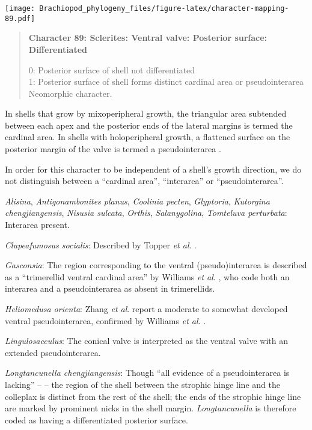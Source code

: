 \documentclass[openany]{book}
\theoremstyle{definition}
\theoremstyle{definition}
\theoremstyle{definition}
\theoremstyle{remark}
\begin{document}
\texttt{[image: Brachiopod\_phylogeny\_files/figure-latex/character-mapping-89.pdf]}

\begin{quote}
\textbf{Character 89: Sclerites: Ventral valve: Posterior surface:
Differentiated}

0: Posterior surface of shell not differentiated\\
1: Posterior surface of shell forms distinct cardinal area or
pseudointerarea\\
Neomorphic character.
\end{quote}

In shells that grow by mixoperipheral growth, the triangular area
subtended between each apex and the posterior ends of the lateral
margins is termed the cardinal area. In shells with holoperipheral
growth, a flattened surface on the posterior margin of the valve is
termed a pseudointerarea
\citep[paraphrasing][]{Williams1997Introduction}.

In order for this character to be independent of a shell's growth
direction, we do not distinguish between a ``cardinal area'',
``interarea'' or ``pseudointerarea''.

\hypertarget{Alisina-coding-89}{}
\emph{Alisina}, \emph{Antigonambonites planus}, \emph{Coolinia pecten},
\emph{Glyptoria}, \emph{Kutorgina chengjiangensis}, \emph{Nisusia
sulcata}, \emph{Orthis}, \emph{Salanygolina}, \emph{Tomteluva
perturbata}: Interarea present.

\hypertarget{Clupeafumosus_socialis-coding-89}{}
\emph{Clupeafumosus socialis}: Described by Topper \emph{et al}.
\citeyearpar{Topper2013Reappraisalof}.

\hypertarget{Gasconsia-coding-89}{}
\emph{Gasconsia}: The region corresponding to the ventral
(pseudo)interarea is described as a ``trimerellid ventral cardinal
area'' by Williams \emph{et al}.
\citeyearpar[p.162]{Williams2000LinguliformeaCraniiformea}, who code
both an interarea and a pseudointerarea as absent in trimerellids.

\hypertarget{Heliomedusa_orienta-coding-89}{}
\emph{Heliomedusa orienta}: Zhang \emph{et al}.
\citeyearpar{Zhang2009Architectureand} report a moderate to somewhat
developed ventral pseudointerarea, confirmed by Williams \emph{et al}.
\citeyearpar{Williams2007Supplement}.

\hypertarget{Lingulosacculus-coding-89}{}
\emph{Lingulosacculus}: The conical valve is interpreted as the ventral
valve with an extended pseudointerarea.

\hypertarget{Longtancunella_chengjiangensis-coding-89}{}
\emph{Longtancunella chengjiangensis}: Though ``all evidence of a
pseudointerarea is lacking'' -- \citet{Zhang2011Theexceptionally} -- the
region of the shell between the strophic hinge line and the colleplax
\citep[fig. 2 in][]{Zhang2011Theexceptionally} is distinct from the rest
of the shell; the ends of the strophic hinge line are marked by
prominent nicks in the shell margin. \emph{Longtancunella} is therefore
coded as having a differentiated posterior surface.
\end{document}
